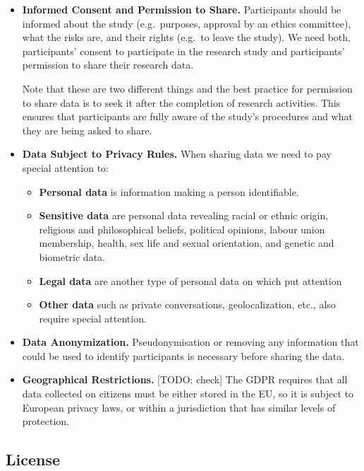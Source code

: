 \documentclass[
  11pt,
]{book}
\providecommand{\tightlist}{%
  \setlength{\itemsep}{0pt}\setlength{\parskip}{0pt}}
\begin{document}
\begin{itemize}
\item
  \textbf{Informed Consent and Permission to Share.} Participants should be informed about the study (e.g.~purposes, approval by an ethics committee), what the risks are, and their rights (e.g.~to leave the study). We need both, participants' consent to participate in the research study and participants' permission to share their research data.

  Note that these are two different things and the best practice for permission to share data is to seek it after the completion of research activities. This ensures that participants are fully aware of the study's procedures and what they are being asked to share.
\item
  \textbf{Data Subject to Privacy Rules.} When sharing data we need to pay special attention to:

  \begin{itemize}
  \tightlist
  \item
    \textbf{Personal data} is information making a person identifiable.
  \item
    \textbf{Sensitive data} are personal data revealing racial or ethnic origin, religious and philosophical beliefs, political opinions, labour union membership, health, sex life and sexual orientation, and genetic and biometric data.
  \item
    \textbf{Legal data} are another type of personal data on which put attention
  \item
    \textbf{Other data} such as private conversations, geolocalization, etc., also require special attention.
  \end{itemize}
\item
  \textbf{Data Anonymization.} Pseudonymisation or removing any information that could be used to identify participants is necessary before sharing the data.
\item
  \textbf{Geographical Restrictions.} {[}TODO: check{]} The GDPR requires that all data collected on citizens must be either stored in the EU, so it is subject to European privacy laws, or within a jurisdiction that has similar levels of protection.
\end{itemize}

\hypertarget{license-data}{%
\subsection{License}\label{license-data}}
\end{document}
